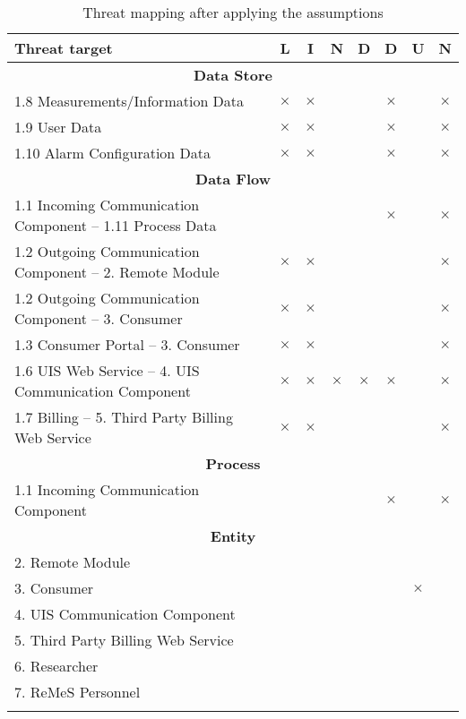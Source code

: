 \begin{center}
	\begin{longtable}{p{9cm}ccccccc}
	\toprule[1pt]
	\bf Threat target & \bf L & \bf I & \bf N & \bf D & \bf D & \bf U & \bf N \\
	\midrule[0.5pt]
	\multicolumn{8}{c}{\textbf{Data Store}} \\
	\midrule[0.5pt]
	\footnotesize 1.8 Measurements/Information Data & $\times$ & $\times$ &  &  & $\times$ &  & $\times$ \\
	\footnotesize 1.9 User Data 					& $\times$ & $\times$ &  &  & $\times$ &  & $\times$ \\
	\footnotesize 1.10 Alarm Configuration Data 	& $\times$ & $\times$ &  &  & $\times$ &  & $\times$ \\
	\midrule[0.5pt]
	\multicolumn{8}{c}{\textbf{Data Flow}} \\
	\midrule[0.5pt]
	\footnotesize 1.1 Incoming Communication Component -- 1.11 Process Data &          &          &          &          & $\times$ & & $\times$ \\
	\footnotesize 1.2 Outgoing Communication Component -- 2. Remote Module 	& $\times$ & $\times$ &          &          &          & & $\times$ \\
	\footnotesize 1.2 Outgoing Communication Component -- 3. Consumer 		& $\times$ & $\times$ &          &          &          & & $\times$ \\
	\footnotesize 1.3 Consumer Portal -- 3. Consumer 						& $\times$ & $\times$ &          &          &          & & $\times$ \\
	\footnotesize 1.6 UIS Web Service -- 4. UIS Communication Component 	& $\times$ & $\times$ & $\times$ & $\times$ & $\times$ & & $\times$ \\ %
	\footnotesize 1.7 Billing -- 5. Third Party Billing Web Service 		& $\times$ & $\times$ &          &          &          & & $\times$ \\
	\midrule[0.5pt]
	\multicolumn{8}{c}{\textbf{Process}} \\
	\midrule[0.5pt]
	\footnotesize 1.1 Incoming Communication Component 	&  &  &  &  & $\times$ & & $\times$ \\
	\midrule[0.5pt]
	\multicolumn{8}{c}{\textbf{Entity}} \\
	\midrule[0.5pt]
	\footnotesize 2. Remote Module 						&  &  &  &  &  &          & \\
	\footnotesize 3. Consumer 							&  &  &  &  &  & $\times$ & \\
	\footnotesize 4. UIS Communication Component 		&  &  &  &  &  &          & \\
	\footnotesize 5. Third Party Billing Web Service 	&  &  &  &  &  &          & \\
	\footnotesize 6. Researcher 						&  &  &  &  &  &          & \\
	\footnotesize 7. ReMeS Personnel 					&  &  &  &  &  &          & \\
	\bottomrule[1pt]
	\caption{Threat mapping after applying the assumptions}
	\label{table:threat-map-reduced}
	\end{longtable}
\end{center}


